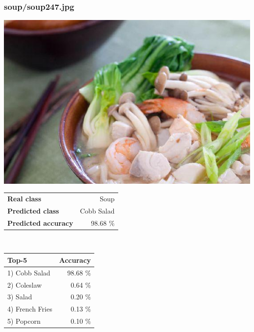 \subsubsection{soup/soup247.jpg}

\begin{minipage}[t]{0.4\textwidth}
	\vspace{0pt}
	\includegraphics[width=\linewidth]{images/evaluation-images/soup/soup247.jpg}
\end{minipage}
\hfill
\begin{minipage}[t]{0.5\textwidth}
	\vspace{0pt}\raggedright
	\begin{tabularx}{\textwidth}{X r}
		\small \textbf{Real class} & \small Soup\\
		\small \textbf{Predicted class} & \small Cobb Salad\\
		\small \textbf{Predicted accuracy} & \small 98.68 \%
    \end{tabularx}\\
    
    \vspace{6pt}
	\begin{tabularx}{\textwidth}{X r}
        \small \textbf{Top-5} & \small \textbf{Accuracy} \\
        \hline
		\small 1) Cobb Salad & \small 98.68 \%\\\small 2) Coleslaw & \small 0.64 \%\\\small 3) Salad & \small 0.20 \%\\\small 4) French Fries & \small 0.13 \%\\\small 5) Popcorn & \small 0.10 \%
    \end{tabularx}
\end{minipage}
    
